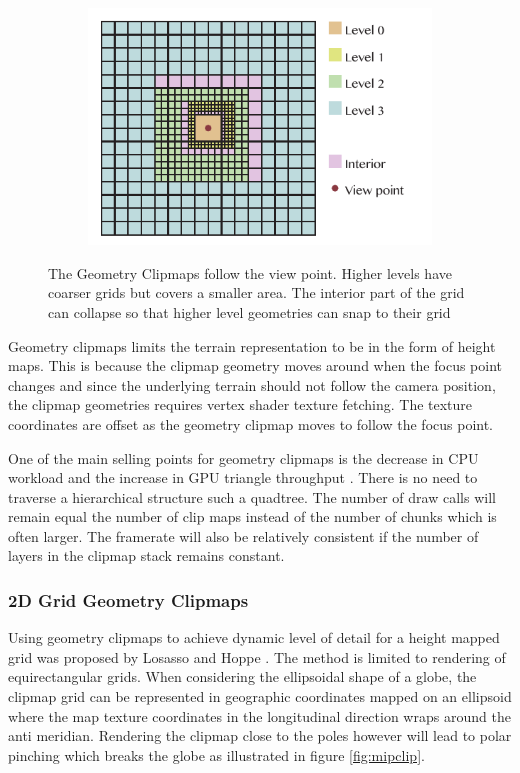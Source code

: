 \begin{figure}[htbp]
    \centering
    \begin{subfigure}[bt]{0.6\textwidth}
        \includegraphics[width=\textwidth]{figures/geometryclipmap/clipmap_geo.pdf}
    \end{subfigure}
    \caption{The Geometry Clipmaps follow the view point. Higher levels have coarser grids but covers a smaller area. The interior part of the grid can collapse so that higher level geometries can snap to their grid}
    \label{fig:clipmapgeometry}
\end{figure}

Geometry clipmaps limits the terrain representation to be in the form of height maps. This is because the clipmap geometry moves around when the focus point changes and since the underlying terrain should not follow the camera position, the clipmap geometries requires vertex shader texture fetching. The texture coordinates are offset as the geometry clipmap moves to follow the focus point.

One of the main selling points for geometry clipmaps is the decrease in CPU workload and the increase in GPU triangle throughput \cite{cozzi11}. There is no need to traverse a hierarchical structure such a quadtree. The number of draw calls will remain equal the number of clip maps instead of the number of chunks which is often larger. The framerate will also be relatively consistent if the number of layers in the clipmap stack remains constant.

\subsubsection{2D Grid Geometry Clipmaps}
Using geometry clipmaps to achieve dynamic level of detail for a height mapped grid was proposed by Losasso and Hoppe \cite{losasso04}. The method is limited to rendering of equirectangular grids. When considering the ellipsoidal shape of a globe, the clipmap grid can be represented in geographic coordinates mapped on an ellipsoid where the map texture coordinates in the longitudinal direction wraps around the anti meridian. Rendering the clipmap close to the poles however will lead to polar pinching which breaks the globe as illustrated in figure \ref{fig:mipclip}.

